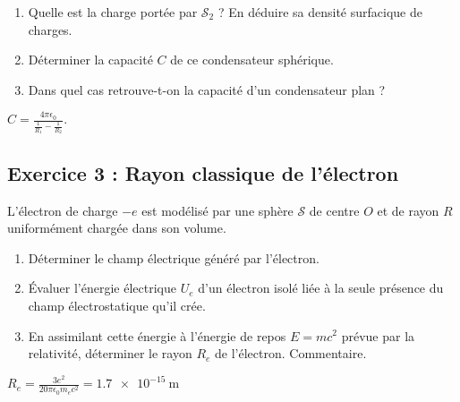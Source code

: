 \begin{enumerate}
	\item Quelle est la charge portée par $\mathcal{S}_2$ ? En déduire sa densité surfacique de charges.
	\item Déterminer la capacité $C$ de ce condensateur sphérique.
	\item Dans quel cas retrouve-t-on la capacité d'un condensateur plan ?
\end{enumerate}

 $C = \frac{4 \pi \epsilon_0}{\frac{1}{R_1}-\frac{1}{R_2}}.$

\subsection{Exercice 3 : Rayon classique de l'électron}

L’électron de charge $-e$ est modélisé par une sphère $\mathcal{S}$ de centre $O$ et de rayon $R$ uniformément chargée dans son volume.

\begin{enumerate}
	\item Déterminer le champ électrique généré par l'électron.
	\item Évaluer l'énergie électrique $U_e$ d'un électron isolé liée à la seule présence du champ électrostatique qu'il crée.
	\item En assimilant cette énergie à l'énergie de repos $E=mc^2$ prévue par la relativité, déterminer le rayon $R_e$ de l'électron. Commentaire.
\end{enumerate}

 $R_e = \frac{3e^2}{20 \pi \epsilon_0 m_e c^2} = \SI{1.7e-15}{\meter}$